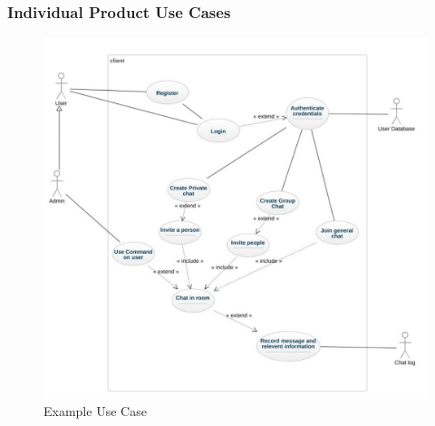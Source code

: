 \documentclass[12pt, titlepage]{article}
\begin{document}
    	\subsubsection{Individual Product Use Cases}
            \begin{figure}[H]
                \centering
                \includegraphics[scale=0.6]{diagram.jpg}
                \caption{Example Use Case}
                \label{fig:my_label}
            \end{figure}
           

 
    		
\end{document}
